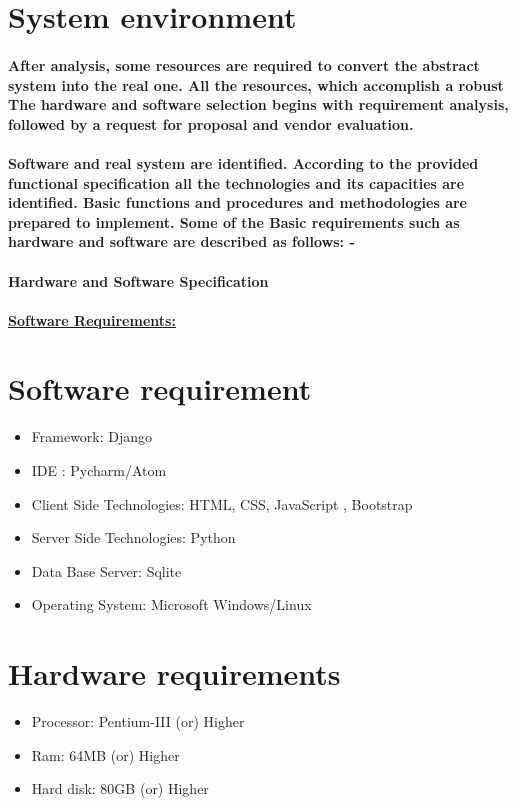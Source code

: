 \documentclass[12pt]{report}
\begin{document}
        \section{System environment}
        \paragraph
        {
        After analysis, some resources are required to convert the abstract system into the real one. All the resources, which accomplish a robust The hardware and software selection begins with requirement analysis, followed by a request for proposal and vendor evaluation.
        }
        \paragraph
        {
        Software and real system are identified. According to the provided functional specification all the technologies and its capacities are identified. Basic functions and procedures and methodologies are prepared to implement. Some of the Basic requirements such as hardware and software are described as follows: -
        }
        \paragraph{\textbf{Hardware and Software Specification}}
        \paragraph{\underline{\textbf{Software Requirements:}}}
        \section{Software requirement}
        \begin{itemize}
            \item Framework: Django
            \item IDE : Pycharm/Atom
            \item Client Side Technologies: HTML, CSS, JavaScript , Bootstrap
            \item Server Side Technologies: Python
            \item Data Base Server: Sqlite
            \item Operating System: Microsoft Windows/Linux 
        \end{itemize}
        
        
        \section{Hardware requirements}
       \begin{itemize}
           \item Processor: Pentium-III (or) Higher
           \item Ram: 64MB (or) Higher
           \item Hard disk: 80GB (or) Higher
       \end{itemize}
\end{document}
